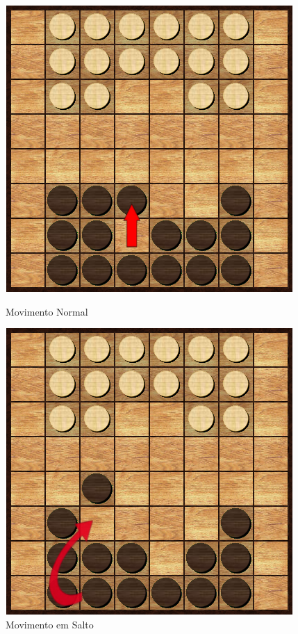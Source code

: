 \documentclass[a4paper]{article}
\begin{document}
\begin{figure}
  \begin{minipage}[b]{0.3\textwidth}
    \includegraphics[width=\textwidth]{res/normalMove.png}
    \caption{Movimento Normal}
    \label{fig:5}
  \end{minipage}
\quad\quad\quad\quad\quad\quad\quad\quad
  \begin{minipage}[b]{0.3\textwidth}
    \includegraphics[width=\textwidth]{res/jumpMove.png}
    \caption{Movimento em Salto}
    \label{fig:6}
  \end{minipage}
\end{figure}
\end{document}
